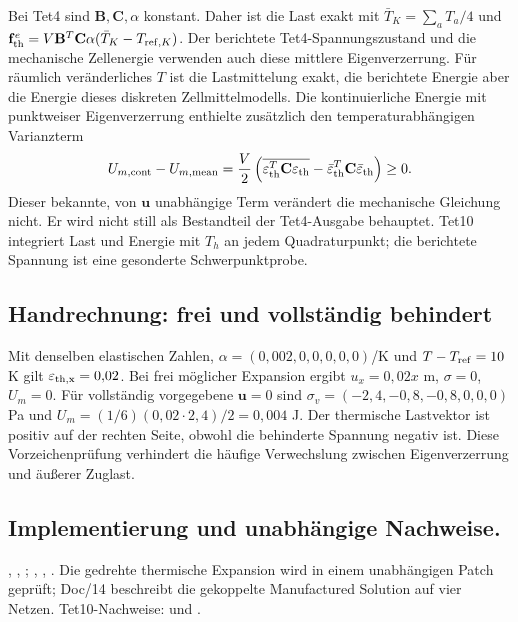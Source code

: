 Bei Tet4 sind $\mathbf B,\mathbf C,\alpha$ konstant. Daher ist die Last exakt
mit $\bar T_K=\sum_a T_a/4$ und
$\mathbf f_{\rm th}^e=V\mathbf B^T\mathbf C\alpha(\bar T_K-T_{{\rm ref},K})$.
Der berichtete Tet4-Spannungszustand und die mechanische Zellenergie verwenden
auch diese mittlere Eigenverzerrung. Für räumlich veränderliches $T$ ist die
Lastmittelung exakt, die berichtete Energie aber die Energie dieses diskreten
Zellmittelmodells. Die kontinuierliche Energie mit punktweiser Eigenverzerrung
enthielte zusätzlich den temperaturabhängigen Varianzterm
\begin{equation}\label{eq:thermal-variance}
U_{m,\rm cont}-U_{m,\rm mean}
=\frac V2\left(\overline{\varepsilon_{\rm th}^T\mathbf C\varepsilon_{\rm th}}
-\bar\varepsilon_{\rm th}^T\mathbf C\bar\varepsilon_{\rm th}\right)\ge0.
\end{equation}
Dieser bekannte, von $\mathbf u$ unabhängige Term verändert die mechanische
Gleichung nicht. Er wird nicht still als Bestandteil der Tet4-Ausgabe behauptet.
Tet10 integriert Last und Energie mit $T_h$ an jedem Quadraturpunkt; die
berichtete Spannung ist eine gesonderte Schwerpunktprobe.

\subsection{Handrechnung: frei und vollständig behindert}
Mit denselben elastischen Zahlen, $\alpha=(0{,}002,0,0,0,0,0)$/K und
$T-T_{\rm ref}=10$ K gilt $\varepsilon_{\rm th,x}=0{,}02$.
Bei frei möglicher Expansion ergibt $u_x=0{,}02x$ m, $\sigma=0$, $U_m=0$.
Für vollständig vorgegebene $\mathbf u=0$ sind
$\sigma_v=(-2{,}4,-0{,}8,-0{,}8,0,0,0)$ Pa und
$U_m=(1/6)(0{,}02\cdot2{,}4)/2=0{,}004$ J.
Der thermische Lastvektor ist positiv auf der rechten Seite, obwohl die
behinderte Spannung negativ ist. Diese Vorzeichenprüfung verhindert die
häufige Verwechslung zwischen Eigenverzerrung und äußerer Zuglast.

\subsection*{Implementierung und unabhängige Nachweise.}
{\small\raggedright
{},
,
;
,
,
.
Die gedrehte thermische Expansion wird in einem unabhängigen Patch geprüft;
Doc/14 beschreibt die gekoppelte Manufactured Solution auf vier Netzen.
Tet10-Nachweise:  und
.

\par}
